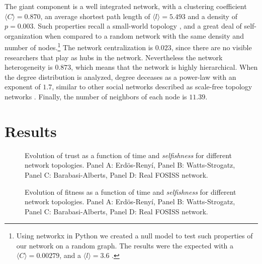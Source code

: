 The giant component is a well integrated network, with a clustering
coefficient $\langle C \rangle = 0.870$, an average shortest path
length of $\langle l \rangle = 5.493$ and a density of $p = 0.003$. Such
properties recall a small-world topology \cite{Watts1998}, and a great
deal of self-organization when compared to a random network with the
same density and number of nodes.\footnote{Using networkx in Python we
created a null model to test such properties of our network on a
random graph. The results were the expected with a $\langle C
\rangle = 0.00279$, and a $\langle l \rangle = 3.6$
\cite{Watts1998}.} The network centralization is $0.023$, since there
are no visible researchers that play as hubs in the network.
Nevertheless the network heterogeneity is $0.873$, which means that
the network is highly hierarchical. When the degree distribution is
analyzed, degree deceases as a power-law with an exponent of $1.7$,
similar to other social networks described as scale-free topology
networks \cite{Barabasi1999}. Finally, the number of neighbors of each
node is $11.39$.\\  



\section{Results}
\label{sec:3}


\begin{figure}
\caption{Evolution of trust as a function of time and \emph{selfishness} for different network topologies. Panel A: Erd\"os-Reny\'i, Panel B: Watts-Strogatz, Panel C: Barabasi-Alberts, Panel D: Real FOSISS network.}
\label{fig:1}       %
\end{figure}

\FloatBarrier

\begin{figure}
\caption{Evolution of fitness as a function of time and \emph{selfishness} for different network topologies. Panel A: Erd\"os-Reny\'i, Panel B: Watts-Strogatz, Panel C: Barabasi-Alberts, Panel D: Real FOSISS network.}
\label{fig:2}       %
\end{figure}

